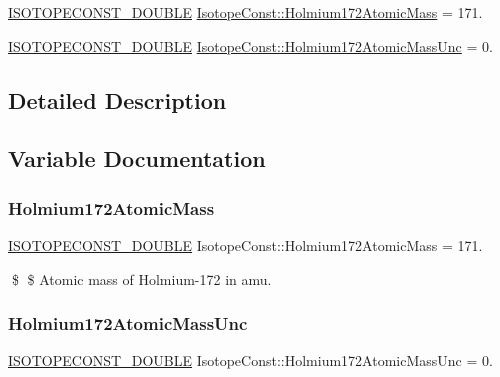 \begin{DoxyCompactItemize}
\item 
\mbox{\hyperlink{group___isotope_const-_macros_ga8f45a7272ce02c0b4c65c44636ed719a}{I\+S\+O\+T\+O\+P\+E\+C\+O\+N\+S\+T\+\_\+\+D\+O\+U\+B\+LE}} \mbox{\hyperlink{group___isotope_const-_holmium-_ho172_gae2e915111f9580969f5d01e43e548431}{Isotope\+Const\+::\+Holmium172\+Atomic\+Mass}} = 171.
\item 
\mbox{\hyperlink{group___isotope_const-_macros_ga8f45a7272ce02c0b4c65c44636ed719a}{I\+S\+O\+T\+O\+P\+E\+C\+O\+N\+S\+T\+\_\+\+D\+O\+U\+B\+LE}} \mbox{\hyperlink{group___isotope_const-_holmium-_ho172_gaa301a9ced3ecc755b0c0b3805c887c20}{Isotope\+Const\+::\+Holmium172\+Atomic\+Mass\+Unc}} = 0.
\end{DoxyCompactItemize}


\subsection{Detailed Description}


\subsection{Variable Documentation}
\mbox{\label{group___isotope_const-_holmium-_ho172_gae2e915111f9580969f5d01e43e548431}} 
\subsubsection{\texorpdfstring{Holmium172\+Atomic\+Mass}{Holmium172AtomicMass}}
{\footnotesize\ttfamily \mbox{\hyperlink{group___isotope_const-_macros_ga8f45a7272ce02c0b4c65c44636ed719a}{I\+S\+O\+T\+O\+P\+E\+C\+O\+N\+S\+T\+\_\+\+D\+O\+U\+B\+LE}} Isotope\+Const\+::\+Holmium172\+Atomic\+Mass = 171.}

\$ \$ Atomic mass of Holmium-\/172 in amu. \mbox{\label{group___isotope_const-_holmium-_ho172_gaa301a9ced3ecc755b0c0b3805c887c20}} 
\subsubsection{\texorpdfstring{Holmium172\+Atomic\+Mass\+Unc}{Holmium172AtomicMassUnc}}
{\footnotesize\ttfamily \mbox{\hyperlink{group___isotope_const-_macros_ga8f45a7272ce02c0b4c65c44636ed719a}{I\+S\+O\+T\+O\+P\+E\+C\+O\+N\+S\+T\+\_\+\+D\+O\+U\+B\+LE}} Isotope\+Const\+::\+Holmium172\+Atomic\+Mass\+Unc = 0.}

